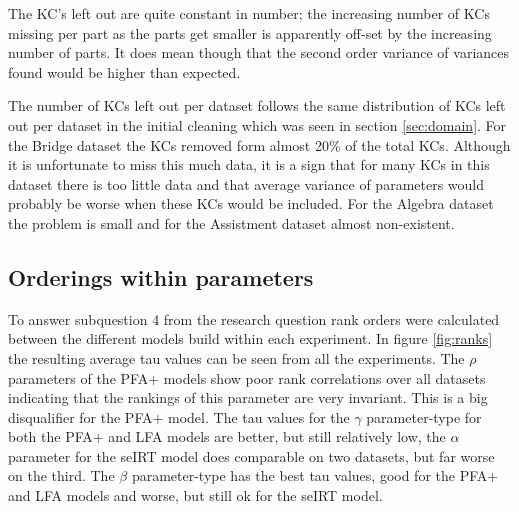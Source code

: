 \documentclass{scrartcl}
\begin{document}
The KC's left out are quite constant in number; the increasing number of KCs missing per part as the parts get smaller is apparently off-set by the increasing number of parts. It does mean though that the second order variance of variances found would be higher than expected.

The number of KCs left out per dataset follows the same distribution of KCs left out per dataset in the initial cleaning which was seen in section \ref{sec:domain}. For the Bridge dataset the KCs removed form almost 20\% of the total KCs. Although it is unfortunate to miss this much data, it is a sign that for many KCs in this dataset there is too little data and that average variance of parameters would probably be worse when these KCs would be included. For the Algebra dataset the problem is small and for the Assistment dataset almost non-existent.

\subsection{Orderings within parameters}
To answer subquestion 4 from the research question rank orders were calculated between the different models build within each experiment. In figure \ref{fig:ranks} the resulting average tau values can be seen from all the experiments. The $\rho$ parameters of the PFA+ models show poor rank correlations over all datasets indicating that the rankings of this parameter are very invariant. This is a big disqualifier for the PFA+ model.
The tau values for the $\gamma$ parameter-type for both the PFA+ and LFA models are better, but still relatively low, the $\alpha$ parameter for the seIRT model does comparable on two datasets, but far worse on the third.
The $\beta$ parameter-type has the best tau values, good for the PFA+ and LFA models and worse, but still ok for the seIRT model.
\end{document}
